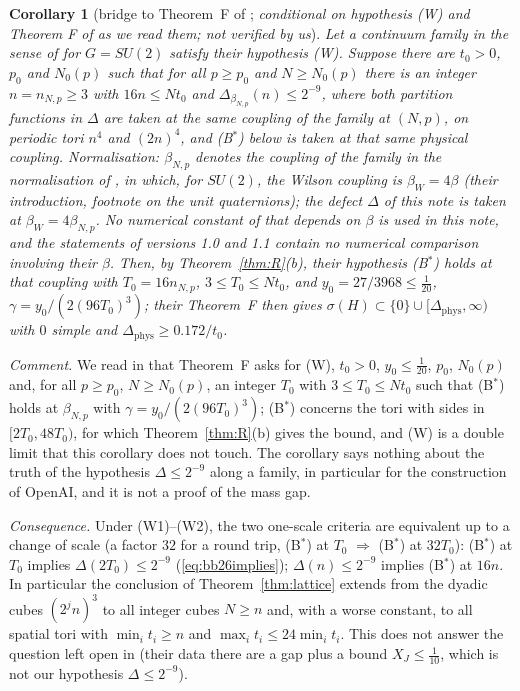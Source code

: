\documentclass[11pt,a4paper]{article}
\theoremstyle{plain}
\newtheorem{corollary}[theorem]{Corollary}
\theoremstyle{definition}
\theoremstyle{remark}
\numberwithin{equation}{section}
\begin{document}
\begin{corollary}[bridge to Theorem~F of \cite{BB26v5}; \emph{conditional on hypothesis (W) and Theorem F of \cite{BB26v5} as we read them; not verified by us}]\label{cor:bridge}
Let a continuum family in the sense of \cite[Definition~7.1]{BB26v5} for $G=SU(2)$ satisfy their hypothesis (W). Suppose there are $t_0>0$, $p_0$ and $N_0(p)$ such that for all $p\ge p_0$ and $N\ge N_0(p)$ there is an integer $n=n_{N,p}\ge3$ with $16n\le Nt_0$ and $\Delta_{\beta_{N,p}}(n)\le2^{-9}$, where both partition functions in $\Delta$ are taken at the \emph{same} coupling of the family at $(N,p)$, on periodic tori $n^4$ and $(2n)^4$, and (B$^*$) below is taken at that same physical coupling. \emph{Normalisation:} $\beta_{N,p}$ denotes the coupling of the family in the normalisation of \cite{BB26v5}, in which, for $SU(2)$, the Wilson coupling is $\beta_W=4\beta$ (their introduction, footnote on the unit quaternions); the defect $\Delta$ of this note is taken at $\beta_W=4\beta_{N,p}$. No numerical constant of \cite{BB26v5} that depends on $\beta$ is used in this note, and the statements of versions 1.0 and 1.1 contain no numerical comparison involving their $\beta$. Then, by Theorem~\ref{thm:R}(b), their hypothesis (B$^*$) holds at that coupling with $T_0=16n_{N,p}$, $3\le T_0\le Nt_0$, and $y_0=27/3968\le\frac1{20}$, $\gamma=y_0/(2(96T_0)^3)$; their Theorem~F then gives $\sigma(H)\subset\{0\}\cup[\Delta_{\mathrm{phys}},\infty)$ with $0$ simple and $\Delta_{\mathrm{phys}}\ge0.172/t_0$.
\end{corollary}
\noindent\emph{Comment.} We read in \cite{BB26v5} that Theorem~F asks for (W), $t_0>0$, $y_0\le\frac1{20}$, $p_0$, $N_0(p)$ and, for all $p\ge p_0$, $N\ge N_0(p)$, an integer $T_0$ with $3\le T_0\le Nt_0$ such that (B$^*$) holds at $\beta_{N,p}$ with $\gamma=y_0/(2(96T_0)^3)$; (B$^*$) concerns the tori with sides in $[2T_0,48T_0)$, for which Theorem~\ref{thm:R}(b) gives the bound, and (W) is a double limit that this corollary does not touch. The corollary says nothing about the truth of the hypothesis $\Delta\le2^{-9}$ along a family, in particular for the construction of OpenAI, and it is not a proof of the mass gap.

\medskip\noindent\emph{Consequence.} Under (W1)--(W2), the two one-scale criteria are equivalent up to a change of scale (a factor $32$ for a round trip, (B$^*$) at $T_0$ $\Rightarrow$ (B$^*$) at $32T_0$): (B$^*$) at $T_0$ implies $\Delta(2T_0)\le2^{-9}$ (\eqref{eq:bb26implies}); $\Delta(n)\le2^{-9}$ implies (B$^*$) at $16n$. In particular the conclusion of Theorem~\ref{thm:lattice} extends from the dyadic cubes $(2^jn)^3$ to all integer cubes $N\ge n$ and, with a worse constant, to all spatial tori with $\min_it_i\ge n$ and $\max_it_i\le24\min_it_i$. This does not answer the question left open in \cite{BB26v5} (their data there are a gap plus a bound $X_J\le\frac1{10}$, which is not our hypothesis $\Delta\le2^{-9}$).
\end{document}
